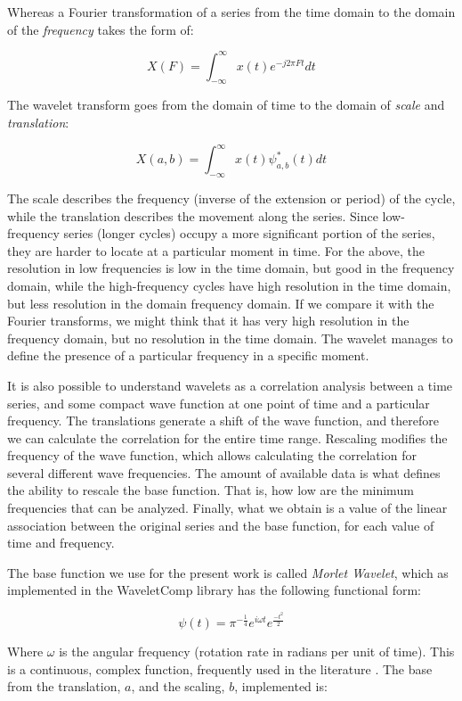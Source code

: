 \documentclass[a4paper,10cpi]{article}
\begin{document}
	Whereas a Fourier transformation of a series from the time domain to the domain of the \textit{frequency} takes the form of:
	
	$$
	X(F)=\int_{-\infty}^{\infty} x(t) e^{-j2\pi Ft}dt
	$$
	
	The wavelet transform goes from the domain of time to the domain of \textit{scale} and \textit{translation}:
	
	$$
	X(a,b)=\int_{-\infty}^{\infty} x(t) \psi^*_{a,b}(t)dt
	$$
	
	The scale describes the frequency (inverse of the extension or period) of the cycle, while the translation describes the movement along the series. Since low-frequency series (longer cycles) occupy a more significant portion of the series, they are harder to locate at a particular moment in time. For the above, the resolution in low frequencies is low in the time domain, but good in the frequency domain, while the high-frequency cycles have high resolution in the time domain, but less resolution in the domain frequency domain. If we compare it with the Fourier transforms, we might think that it has very high resolution in the frequency domain, but no resolution in the time domain. The wavelet manages to define the presence of a particular frequency in a specific moment.
	
	It is also possible to understand wavelets as a correlation analysis between a time series, and some compact wave function at one point of time and a particular frequency. The translations generate a shift of the wave function, and therefore we can calculate the correlation for the entire time range. Rescaling modifies the frequency of the wave function, which allows calculating the correlation for several different wave frequencies. The amount of available data is what defines the ability to rescale the base function. That is, how low are the minimum frequencies that can be analyzed. Finally, what we obtain is a value of the linear association between the original series and the base function, for each value of time and frequency.
	
	The base function we use for the present work is called \textit{Morlet Wavelet}, which as implemented in the WaveletComp \citep{Roesch2018} library has the following functional form:
	
	$$
	\psi(t)=\pi^{-\frac{1}{4}}e^{i\omega t}e^{\frac{-t^2}{2}}
	$$
	
	
	Where $\omega$ is the angular frequency (rotation rate in radians per unit of time). This is a continuous, complex function, frequently used in the literature \citep{conraria2011continuous}. The base from the translation, $a$, and the scaling, $b$, implemented is:
	
\end{document}

